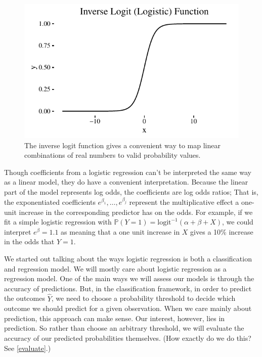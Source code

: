 \documentclass[12pt,twoside]{reedthesis}
\begin{document}
  \begin{figure}[tbh]
  \centering
  \includegraphics[angle = 0,scale = 1]{figure/logit_plot.pdf}
  \caption[The inverse logit function gives a convenient way to map linear
  combinations of real numbers to valid probability values.]{\normalsize{The inverse logit function gives a convenient way to map linear
  combinations of real numbers to valid probability values.}}
  \label{fig:logit-plot}
  \end{figure}
  
  Though coefficients from a logistic regression can't be interpreted the
  same way as a linear model, they do have a convenient interpretation.
  Because the linear part of the model represents log odds, the
  coefficients are log odds ratios; That is, the exponentiated
  coefficients \(e^{\beta_1}, \ldots, e^{\beta_j}\) represent the
  multiplicative effect a one-unit increase in the corresponding predictor
  has on the odds. For example, if we fit a simple logistic regression
  with \(\mathbb{P}(Y = 1) = \text{logit}^{-1} (\alpha + \beta + X)\), we
  could interpret \(e^{\beta} = 1.1\) as meaning that a one unit increase
  in \(X\) gives a 10\% increase in the odds that \(Y = 1\).
  
  We started out talking about the ways logistic regression is both a
  classification and regression model. We will mostly care about logistic
  regression as a regression model. One of the main ways we will assess
  our models is through the accuracy of predictions. But, in the
  classification framework, in order to predict the outcomes \(\hat{Y}\),
  we need to choose a probability threshold to decide which outcome we
  should predict for a given observation. When we care mainly about
  prediction, this approach can make sense. Our interest, however, lies in
  prediction. So rather than choose an arbitrary threshold, we will
  evaluate the accuracy of our predicted probabilities themselves. (How
  exactly do we do this? See \autoref{evaluate}.)
  
\end{document}
